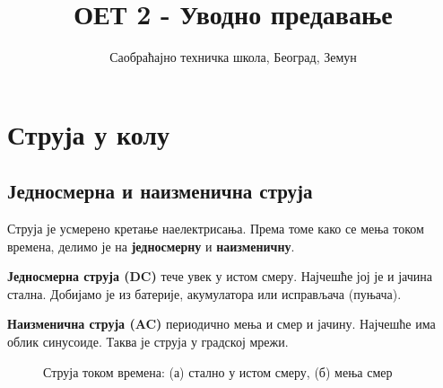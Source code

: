 \documentclass{article}
\title{ОЕТ 2 - Уводно предавање}
\author{Саобраћајно техничка школа, Београд, Земун}
\begin{document}
\maketitle


\section{Струја у колу}

\subsection{Једносмерна и наизменична струја}

Струја је усмерено кретање наелектрисања. Према томе како се мења током времена, делимо је на \textbf{једносмерну} и \textbf{наизменичну}.

\textbf{Једносмерна струја (DC)} тече увек у истом смеру. Најчешће јој је и јачина стална. Добијамо је из батерије, акумулатора или исправљача (пуњача).

\textbf{Наизменична струја (AC)} периодично мења и смер и јачину. Најчешће има облик синусоиде. Таква је струја у градској мрежи.

\begin{figure}[H]
    \centering
    \caption{Струја током времена: (а) стално у истом смеру, (б) мења смер}
    \label{fig:dc-ac}
\end{figure}
\end{document}
